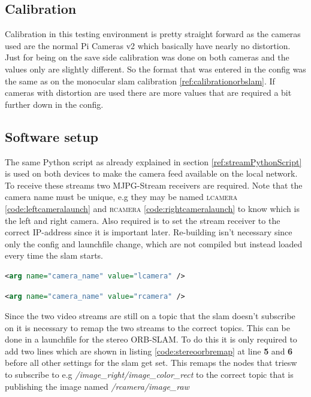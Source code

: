 \subsection{Calibration}
Calibration in this testing environment is pretty straight forward as the cameras used are the normal Pi Cameras v2 which basically have nearly no distortion. Just for being on the save side calibration was done on both cameras and the values only are slightly different. So the format that was entered in the config was the same as on the monocular \gls{slam} calibration \ref{ref:calibrationorbslam}. If cameras with distortion are used there are more values that are required a bit further down in the config.

\subsection{Software setup}
The same Python script as already explained in section \ref{ref:streamPythonScript} is used on both devices to make the camera feed available on the local network. To receive these streams two MJPG-Stream receivers are required. Note that the camera name must be unique, e.g they may be named \textsc{lcamera} \ref{code:leftcameralaunch} and \textsc{rcamera} \ref{code:rightcameralaunch} to know which is the left and right camera. Also required is to set the stream receiver to the correct IP-address since it is important later. Re-building isn't necessary since only the config and launchfile change, which are not compiled but instead loaded every time the \gls{slam} starts.\newline
\begin{lstlisting}[language=XML,caption={Left camera stream launch file},label={code:leftcameralaunch}]
	  	<arg name="camera_name" value="lcamera" />
\end{lstlisting}
\begin{lstlisting}[language=XML,caption={Right camera stream launch file},label={code:rightcameralaunch}]
	  	<arg name="camera_name" value="rcamera" />
\end{lstlisting}

Since the two video streams are still on a topic that the \gls{slam} doesn't subscribe on it is necessary to remap the two streams to the correct topics. This can be done in a launchfile for the stereo ORB-SLAM.
To do this it is only required to add two lines which are shown in listing \ref{code:stereoorbremap} at line \textbf{5} and \textbf{6} before all other settings for the \gls{slam} get set. This remaps the nodes that triesw to subscribe to e.g \textit{/image\_right/image\_color\_rect} to the correct topic that is publishing the image named \textit{/rcamera/image\_raw} \newline


